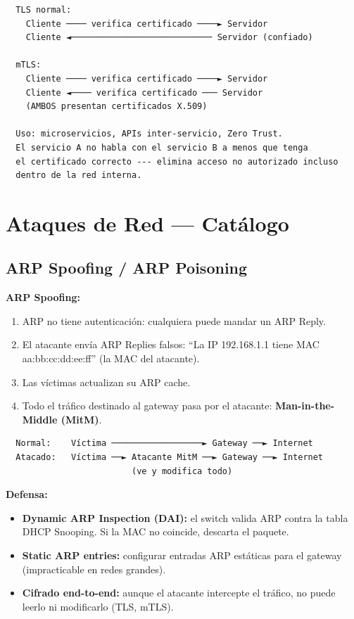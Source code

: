 \begin{lstlisting}
  TLS normal:
    Cliente ──── verifica certificado ────► Servidor
    Cliente ◄──────────────────────────── Servidor (confiado)

  mTLS:
    Cliente ──── verifica certificado ────► Servidor
    Cliente ◄──── verifica certificado ─── Servidor
    (AMBOS presentan certificados X.509)

  Uso: microservicios, APIs inter-servicio, Zero Trust.
  El servicio A no habla con el servicio B a menos que tenga
  el certificado correcto --- elimina acceso no autorizado incluso
  dentro de la red interna.
\end{lstlisting}

\section{ Ataques de Red --- Catálogo}

\subsection{ARP Spoofing / ARP Poisoning}

\begin{cuidado}
\textbf{ARP Spoofing:}

\begin{enumerate}
    \item ARP no tiene autenticación: cualquiera puede mandar un ARP Reply.
    \item El atacante envía ARP Replies falsos: ``La IP 192.168.1.1 tiene
          MAC aa:bb:cc:dd:ee:ff'' (la MAC del atacante).
    \item Las víctimas actualizan su ARP cache.
    \item Todo el tráfico destinado al gateway pasa por el atacante:
          \textbf{Man-in-the-Middle (MitM)}.
\end{enumerate}

\begin{lstlisting}
  Normal:    Víctima ──────────────────► Gateway ──► Internet
  Atacado:   Víctima ──► Atacante MitM ──► Gateway ──► Internet
                         (ve y modifica todo)
\end{lstlisting}

\textbf{Defensa:}
\begin{itemize}
    \item \textbf{Dynamic ARP Inspection (DAI):} el switch valida ARP contra
          la tabla DHCP Snooping. Si la MAC no coincide, descarta el paquete.
    \item \textbf{Static ARP entries:} configurar entradas ARP estáticas para
          el gateway (impracticable en redes grandes).
    \item \textbf{Cifrado end-to-end:} aunque el atacante intercepte el tráfico,
          no puede leerlo ni modificarlo (TLS, mTLS).
\end{itemize}
\end{cuidado}

